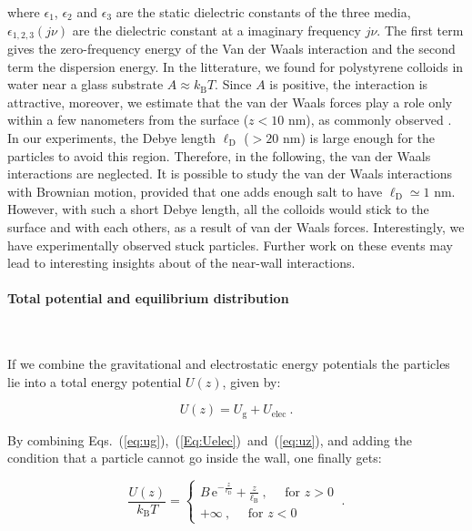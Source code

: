 where $\epsilon_1$, $\epsilon_2$ and $\epsilon_3$ are the static dielectric constants of the three media, $\epsilon_{1,2,3} (j\nu)$ are the  dielectric constant at a imaginary frequency $ j \nu$. The first term gives the zero-frequency energy of the Van der Waals interaction and the second term the dispersion energy. In the litterature, we found for polystyrene colloids in water near a glass substrate $A\approx k_\mathrm{B}T$. Since $A$ is positive, the interaction is attractive, moreover, we estimate that the van der Waals forces play a role only within a few nanometers from the surface ($z < 10$ nm), as commonly observed \cite{prieve_measurement_1999}. In our experiments, the Debye length $\ell _\mathrm{D}$ ($>20$ nm) is large enough for the particles to avoid this region. Therefore, in the following, the van der Waals interactions are neglected. It is possible to study the van der Waals interactions with Brownian motion, provided that one adds enough salt to have $\ell_\mathrm{D} \simeq 1$ nm. However, with such a short Debye length, all the colloids would stick to the surface and with each others, as a result of van der Waals forces. Interestingly, we have experimentally observed stuck particles. Further work on these events may lead to interesting insights about of the near-wall interactions. 



\paragraph{Total potential and equilibrium distribution}\mbox{}\\
\label{test}
\vspace{0.10cm}

If we combine the gravitational and electrostatic energy potentials the particles lie into a total energy potential $U(z)$, given by:

\begin{equation}
	U(z) = U_\mathrm{g} + U_\mathrm{elec}~.
	\label{eq:uz}
\end{equation}

By combining Eqs.~(\ref{eq:ug}),~(\ref{Eq:Uelec})~and~(\ref{eq:uz}), and adding the condition that a particle cannot go inside the wall, one finally gets:

\begin{equation}
	\frac{U(z)}{k_\mathrm{B}T} =  \left\{
	\begin{array}{l}
		\displaystyle B\,\textrm{e}^{-\frac{z}{\ell_\mathrm{D}}} + \frac{z}{\ell_\mathrm{B}}\ ,\quad \text{ for } z>0 \\
		+\infty\ ,\quad  \text{ for } z < 0
	\end{array}
	\right. \ .
	\label{Eq:PDF}
\end{equation}

